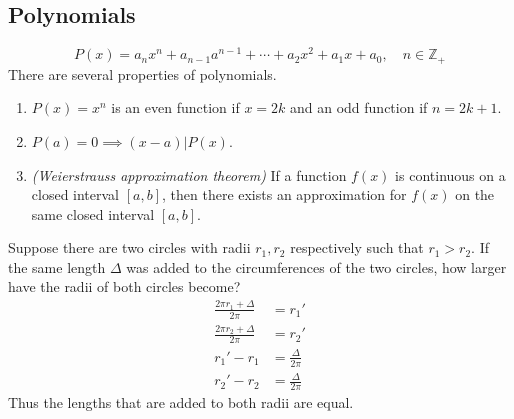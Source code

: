 \documentclass[11pt]{article}
\begin{document}
\subsection{Polynomials}
$$
  P\left(x\right) = a_{n}x^{n} + a_{n-1}a^{n-1} + \cdots +a_{2}x^{2} + a_{1}x + a_{0},\quad n \in \mathbb{Z}_{+}
$$
There are several properties of polynomials.
\begin{enumerate}
  \item $P\left(x\right) = x^{n}$ is an even function if $x = 2k$ and an odd function if $n = 2k +1$.
  \item $P\left(a\right) = 0 \implies \left(x-a\right)|P\left(x\right)$.
  \item \emph{(Weierstrauss approximation theorem)} If a function $f\left(x\right)$ is continuous on a closed interval $\left[a,b\right]$, then there exists an approximation for $f\left(x\right)$ on the same closed interval $\left[a,b\right]$.
\end{enumerate}
Suppose there are two circles with radii $r_{1}, r_{2}$ respectively such that $r_{1} > r_{2}$. If the same length $\Delta$ was added to the circumferences of the two circles, how larger have the radii of both circles become?
\begin{align*}
  \frac{2\pi r_{1} + \Delta}{2\pi} &= r_{1}'\\
  \frac{2\pi r_{2} + \Delta}{2\pi} &= r_{2}'\\
  r_{1}' - r_{1} &= \frac{\Delta}{2\pi}\\
  r_{2}' - r_{2} &= \frac{\Delta}{2\pi}
\end{align*}
Thus the lengths that are added to both radii are equal.
\end{document}
